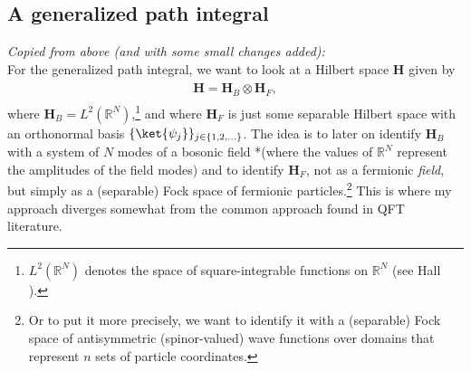 \documentclass{report}
\begin{document}
\subsection{A generalized path integral}
\textit{Copied from above (and with some small changes added):}\\
For the generalized path integral, we want to look at a Hilbert space $\textbf{H}$ given by
\begin{align}
\begin{aligned}
	\textbf{H} = \textbf{H}_{B} \otimes \textbf{H}_{F},
\end{aligned}
\end{align} 
where $\textbf{H}_B = L^2(\mathbb{R}^N)$,\footnote{
	$L^2(\mathbb{R}^N)$ denotes the space of square-integrable functions on $\mathbb{R}^N$ (see Hall \cite{}).
} 
and where $\textbf{H}_F$ is just some separable Hilbert space 
with an orthonormal basis %
$\{\ket{\psi_j}\}_{j\in \{1, 2, \ldots\}}$. 
The idea is to later on identify $\textbf{H}_{B}$ with a system of $N$ modes of a bosonic field *(where the values of $\mathbb{R}^N$ represent the amplitudes of the field modes) and to identify $\textbf{H}_{F}$, not as a fermionic \emph{field}, but simply as a (separable) Fock space of fermionic particles.\footnote{
	Or to put it more precisely, we want to identify it with a (separable) Fock space of antisymmetric (spinor-valued) wave functions over domains that represent $n$ sets of particle coordinates.
} 
This is where my approach diverges somewhat from the common approach found in QFT literature. 
\end{document}

